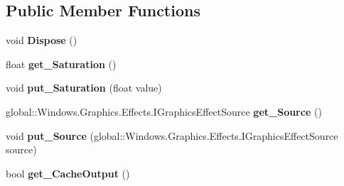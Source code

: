 \subsection*{Public Member Functions}
\begin{DoxyCompactItemize}
\item 
\mbox{\label{class_microsoft_1_1_graphics_1_1_canvas_1_1_effects_1_1_saturation_effect_abc0ee958e63fe41d70f099e8606db15a}} 
void {\bfseries Dispose} ()
\item 
\mbox{\label{class_microsoft_1_1_graphics_1_1_canvas_1_1_effects_1_1_saturation_effect_a6e0d403f8b1765e184055fa4f30f9d37}} 
float {\bfseries get\+\_\+\+Saturation} ()
\item 
\mbox{\label{class_microsoft_1_1_graphics_1_1_canvas_1_1_effects_1_1_saturation_effect_a7befcf53c9ea4a4ca617f8ccaec53562}} 
void {\bfseries put\+\_\+\+Saturation} (float value)
\item 
\mbox{\label{class_microsoft_1_1_graphics_1_1_canvas_1_1_effects_1_1_saturation_effect_afdaaa78102ee494a25fbe75735104301}} 
global\+::\+Windows.\+Graphics.\+Effects.\+I\+Graphics\+Effect\+Source {\bfseries get\+\_\+\+Source} ()
\item 
\mbox{\label{class_microsoft_1_1_graphics_1_1_canvas_1_1_effects_1_1_saturation_effect_ac829b5a4bcc5e71e4c3416214d974fd6}} 
void {\bfseries put\+\_\+\+Source} (global\+::\+Windows.\+Graphics.\+Effects.\+I\+Graphics\+Effect\+Source source)
\item 
\mbox{\label{class_microsoft_1_1_graphics_1_1_canvas_1_1_effects_1_1_saturation_effect_a4b5e5447d01ddec7e99150c6fbc2ed92}} 
bool {\bfseries get\+\_\+\+Cache\+Output} ()
\item 
\mbox{\label{class_microsoft_1_1_graphics_1_1_canvas_1_1_effects_1_1_saturation_effect_a5af768a577277d5763f0ea767eaaf071}} 

\end{DoxyCompactItemize}
